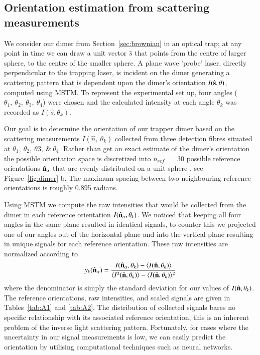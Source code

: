 \documentclass[final,  3p]{elsarticle}
\begin{document}
\subsection{Orientation estimation from scattering measurements}
\label{sec:Bayes}

We consider our dimer from Section~\ref{sec:brownian} in an optical trap; at any point in time we can draw a unit vector $\hat{s}$ that points from the centre of larger sphere, to the centre of the smaller sphere. A plane wave 'probe' laser, directly perpendicular to the trapping laser, is incident on the dimer generating a scattering pattern that is dependent upon the dimer's orientation $I(\hat{\bf s}, \theta)$, computed using MSTM. To represent the experimental set up, four angles  ($\theta_1, \ \theta_2, \ \theta_3, \ \theta_4$) were chosen and the calculated intensity at each angle $\theta_k$ was recorded as $I(\hat{s}, \theta_k)$. 

Our goal is to determine the orientation of our trapper dimer based on the scattering measurements $I(\hat{n}, \ \theta_k)$ collected from three detection fibres situated at $\theta_1,\ \theta_2, \ \theta3, \ \& \ \theta_4$. Rather than get an exact estimate of the dimer's orientation the possible orientation space is discretized into $\textit{n}_{ref} \ = \ 30$ possible reference orientations $\hat{\bf n}_{\alpha}$ that are evenly distributed on a unit sphere \cite{Rey2006}, see Figure~\ref{fig:dimer} b. The maximum spacing between two neighbouring reference orientations is roughly 0.895 radians. 

Using MSTM we compute the raw intensities that would be collected from the dimer in each reference orientation $I(\hat{\bf n}_{\alpha}, \theta_k)$. We noticed that keeping all four angles in the same plane resulted in identical signals, to counter this we projected one of our angles out of the horizontal plane and into the vertical plane resulting in unique signals for each reference orientation. 
%
These raw intensities are normalized according to
\begin{align}
\label{eq:scale}
  y_k(\hat{\bf n}_\alpha)
  = 
  \frac{I(\hat{\bf n}_\alpha, \theta_k) - \langle I(\hat{\bf n},\theta_k) \rangle } 
  {\langle I^2(\hat{\bf n},\theta_k) \rangle -\langle I(\hat{\bf n}, \theta_k)\rangle^2}
\end{align}
where the denominator is simply the standard deviation for our values of $I(\hat{\bf n}, \theta_k)$. The reference orientations, raw intensities, and scaled signals are given in Tables~\ref{tab:A1} and \ref{tab:A2}. The distribution of collected signals bares no specific relationship with its associated reference orientation, this is an inherent problem of the inverse light scattering pattern. Fortunately, for cases where the uncertainty in our signal measurements is low, we can easily predict the orientation by utilising computational techniques such as neural networks. 
\end{document}
